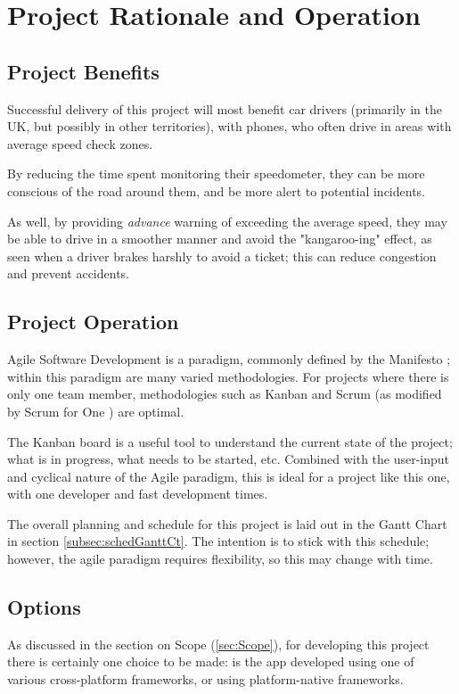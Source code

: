 \documentclass[11pt, a4paper, notitlepage]{report}
\begin{document}
\chapter{Project Rationale and Operation}
\section{Project Benefits}
Successful delivery of this project will most benefit car drivers (primarily in 
the UK, but possibly in other territories), with phones, who often drive in 
areas with average speed check zones. 

By reducing the time spent monitoring their speedometer, they can be more 
conscious of the road around them, and be more alert to potential incidents.

As well, by providing \textit{advance} warning of exceeding the average speed, 
they may be able to drive in a smoother manner and avoid the "kangaroo-ing" 
effect, as seen when a driver brakes harshly to avoid a ticket; this can reduce 
congestion and prevent accidents.

\section{Project Operation}\label{sec:projectOperation}
Agile Software Development is a paradigm, commonly defined by the Manifesto \citep{AgileManifesto}; within this paradigm are many varied methodologies. For 
projects where there is only one team member, methodologies such as Kanban and 
Scrum (as modified by Scrum for One \citep{ScrumForOne}) are optimal. %

The Kanban board is a useful tool to understand the current state of the 
project; what is in progress, what needs to be started, etc. Combined with the 
user-input and cyclical nature of the Agile paradigm, this is ideal for a 
project like this one, with one developer and fast development times.

The overall planning and schedule for this project is laid out in the Gantt 
Chart in section \ref{subsec:schedGanttCt}. The intention is to stick with this 
schedule; however, the agile paradigm requires flexibility, so this may change 
with time.

\section{Options}
As discussed in the section on Scope (\ref{sec:Scope}), for developing this 
project there is certainly one choice to be made: is the app developed using 
one of various cross-platform frameworks, or using platform-native frameworks.
\end{document}
